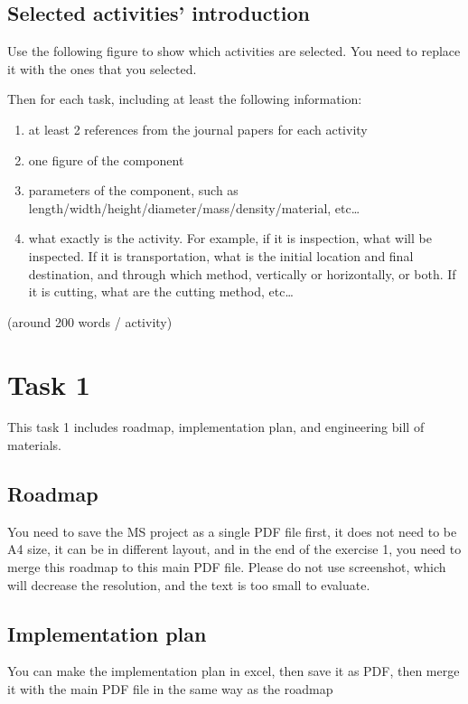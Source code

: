\documentclass{article}
\begin{document}
\bigskip

\subsection{Selected activities’ introduction}
Use the following figure to show which activities are selected. You need to replace it with the ones that you selected.

\begin{tikzpicture}
\end{tikzpicture}


Then for each task, including at least the following information:

\begin{enumerate}
\item at least 2 references from the journal papers for each activity
\item one figure of the component
\item parameters of the component, such as length/width/height/diameter/mass/density/material, etc…
\item what exactly is the activity. For example, if it is inspection, what will be inspected. If it is transportation,
what is the initial location and final destination, and through which method, vertically or horizontally, or both. If
it is cutting, what are the cutting method, etc…
\end{enumerate}
(around 200 words / activity)


\bigskip

\clearpage\section{Task 1}
This task 1 includes roadmap, implementation plan, and engineering bill of materials.

\subsection{Roadmap}
You need to save the MS project as a single PDF file first, it does not need to be A4 size, it can be in different
layout, and in the end of the exercise 1, you need to merge this roadmap to this main PDF file. Please do not use
screenshot, which will decrease the resolution, and the text is too small to evaluate.


\bigskip

\subsection{Implementation plan}
You can make the implementation plan in excel, then save it as PDF, then merge it with the main PDF file in the same way
as the roadmap
\end{document}
